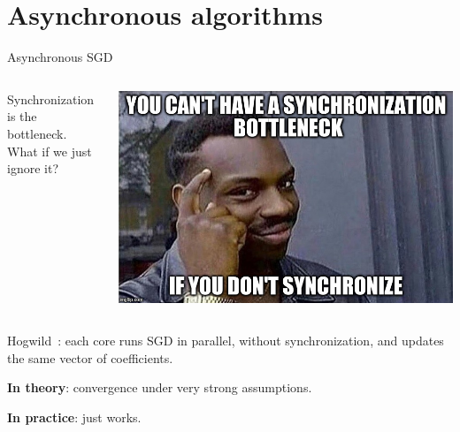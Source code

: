 \documentclass[10pt]{beamer}
\let\oldparencite=\parencite
\renewcommand{\parencite}[1]{\textcolor[rgb]{.7,.7,.7}{\oldparencite{#1}}}
\begin{document}
\section{Asynchronous algorithms}

\begin{frame}{Asynchronous SGD}

\begin{columns}
\begin{column}{0.5\textwidth}  %
Synchronization is the bottleneck. \\

\vspace{1em}{\bfseries Idea:} What if we just ignore it?
\end{column}
\begin{column}{0.5\textwidth}  %
\begin{center}
\includegraphics[width=\linewidth]{img/synchronization}
\end{center}
\end{column}
\end{columns}

\pause
Hogwild~\parencite{hogwild2011}: each core runs SGD in parallel, without synchronization, and updates the same vector of coefficients.

{\bfseries In theory}: convergence under very strong assumptions.

{\bfseries In practice}: just works.

\end{frame}
\end{document}
